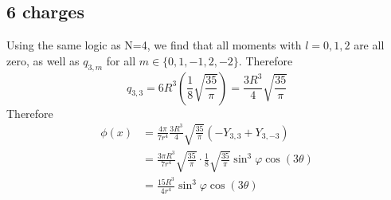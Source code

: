 \subsection{6 charges}
Using the same logic as N=4, we find that all moments with \(l=0,1,2\) are all zero, as well as \(q_{3,m}\) for all \(m\in\{0,1,-1,2,-2\}\). Therefore
\begin{equation}
  q_{3,3}=6R^3\left(\frac{1}{8}\sqrt{\frac{35}{\pi}}\right)=\frac{3R^3}{4}\sqrt{\frac{35}{\pi}}
\end{equation}
Therefore
\begin{align}
  \phi(x)&=\frac{4\pi}{7r^4}\frac{3R^3}{4}\sqrt{\frac{35}{\pi}}(-Y_{3,3}+Y_{3,-3})\\
  &= \frac{3\pi R^3}{7r^4}\sqrt{\frac{35}{\pi}}\cdot\frac{1}{8}\sqrt{\frac{35}{\pi}}\sin^3\varphi\cos(3\theta)\\
  &= \frac{15R^3}{4r^4}\sin^3\varphi\cos(3\theta)
\end{align}